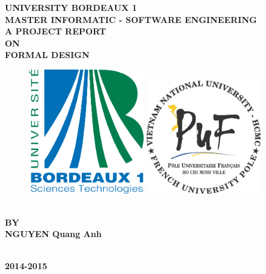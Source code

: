 \newpage
\begin{center}
\thispagestyle{empty}
\Large{\textbf{UNIVERSITY BORDEAUX 1}}\\
\large{\textbf{MASTER INFORMATIC - SOFTWARE ENGINEERING}}\\
\vspace{1cm}
\Large{\textbf{A PROJECT REPORT\\ \large{ON}}}\\[0.7cm]
\LARGE{\textsc {\textbf{FORMAL DESIGN}}}\\[0.5cm]
\vspace{0.5cm}


\begin{figure}[h]
\centering
\includegraphics[width=5cm]{project/images/logo_bx1.jpg}
\hspace{1cm}
\includegraphics[width=5cm]{project/images/logo_puf.jpg}
\end{figure}

\vspace{1cm}
\vspace{1cm}
\Large{\textbf{\\BY}}\\[0.5cm]

\large{\textbf{NGUYEN Quang Anh}}

\vspace{1.5cm}


\large{\textbf{\\2014-2015}}\\
\vspace{1cm}
\newpage
\end{center}